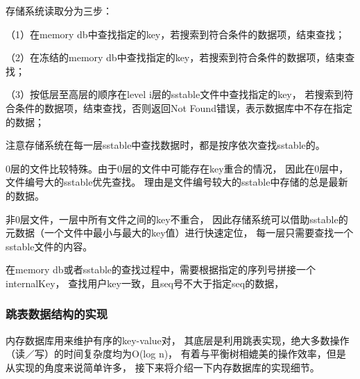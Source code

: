 \begin{enumerate}
		存储系统读取分为三步：

		（1）在memory db中查找指定的key，若搜索到符合条件的数据项，结束查找；

		（2）在冻结的memory db中查找指定的key，若搜索到符合条件的数据项，结束查找；
		
		（3）按低层至高层的顺序在level i层的sstable文件中查找指定的key，
		若搜索到符合条件的数据项，结束查找，否则返回Not Found错误，表示数据库中不存在指定的数据；

		注意存储系统在每一层sstable中查找数据时，都是按序依次查找sstable的。

		0层的文件比较特殊。由于0层的文件中可能存在key重合的情况，
		因此在0层中，文件编号大的sstable优先查找。
		理由是文件编号较大的sstable中存储的总是最新的数据。

		非0层文件，一层中所有文件之间的key不重合，
		因此存储系统可以借助sstable的元数据（一个文件中最小与最大的key值）进行快速定位，
		每一层只需要查找一个sstable文件的内容。

		在memory db或者sstable的查找过程中，需要根据指定的序列号拼接一个internalKey，
		查找用户key一致，且seq号不大于指定seq的数据，
		
	\end{enumerate}
	
		\subsubsection{跳表数据结构的实现}

		内存数据库用来维护有序的key-value对，
		其底层是利用跳表实现，绝大多数操作（读／写）的时间复杂度均为O(log n)，
		有着与平衡树相媲美的操作效率，但是从实现的角度来说简单许多，
		接下来将介绍一下内存数据库的实现细节。

